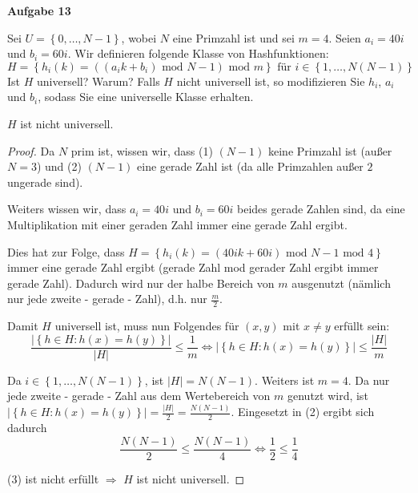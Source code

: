 \documentclass{article}
\begin{document}
{\bfseries Aufgabe 13}%

Sei $U = \left\{ 0, \ldots, N - 1 \right\}$, wobei $N$ eine Primzahl ist und sei
$m = 4$. Seien $a_i = 40i$ und $b_i = 60i$. Wir definieren folgende Klasse von
Hashfunktionen:
\begin{equation}
  H = \left\{ h_i \left( k \right) = \left( \left( a_ik + b_i \right)\text{ mod }N - 1 \right)\text{ mod }m \right\}
  \text{ f{\"u}r } i \in \left\{ 1, \ldots, N \left( N - 1 \right) \right\}
\end{equation}
Ist $H$ universell? Warum? Falls $H$ nicht universell ist, so modifizieren Sie
$h_i$, $a_i$ und $b_i$, sodass Sie eine universelle Klasse erhalten.

\medskip%

$H$ ist nicht universell.

\begin{proof}
Da $N$ prim ist, wissen wir, dass (1) $(N - 1)$ keine Primzahl ist (au{\ss}er
$N = 3$) und (2) $(N - 1)$ eine gerade Zahl ist (da alle Primzahlen au{\ss}er
$2$ ungerade sind).

Weiters wissen wir, dass $a_i = 40i$ und $b_i=60i$ beides gerade Zahlen sind,
da eine Multiplikation mit einer geraden Zahl immer eine gerade Zahl ergibt.


Dies hat zur Folge, dass
$H = \left\{ h_i \left( k \right) = \left( 40ik + 60i \right)\text{ mod } N - 1 \text{ mod } 4 \right\}$
immer eine gerade Zahl ergibt (gerade Zahl mod gerader Zahl ergibt immer gerade
Zahl). Dadurch wird nur der halbe Bereich von $m$ ausgenutzt (n{\"a}mlich nur
jede zweite - gerade - Zahl), d.h. nur $\frac{m}{2}$.

Damit $H$ universell ist, muss nun Folgendes f{\"u}r $\left( x, y \right)$ mit
$x \neq y$ erf{\"u}llt sein:
\begin{equation}
  \frac{|\left\{ h \in H: h\left( x \right) = h\left( y \right) \right\}|}{|H|} \leq \frac{1}{m}
  \Longleftrightarrow
  |\left\{ h \in H: h\left( x \right) = h\left( y \right) \right\}| \leq \frac{|H|}{m}
\end{equation}

Da $i \in \left\{ 1, \ldots, N \left( N - 1 \right) \right\}$, ist
$|H| = N \left( N - 1 \right)$. Weiters ist $m = 4$. Da nur jede zweite -
gerade - Zahl aus dem Wertebereich von $m$ genutzt wird, ist
$|\left\{ h \in H: h\left( x \right) = h\left( y \right) \right\}| = \frac{|H|}{2} = \frac{N \left( N - 1 \right)}{2}$.
Eingesetzt in (2) ergibt sich dadurch
\begin{equation}
  \frac{N \left( N - 1 \right)}{2} \leq \frac{N \left( N - 1 \right)}{4}
  \Longleftrightarrow
  \frac{1}{2} \leq \frac{1}{4}
\end{equation}

(3) ist nicht erf{\"u}llt $\Rightarrow$ $H$ ist nicht universell.
\end{proof}
\end{document}
